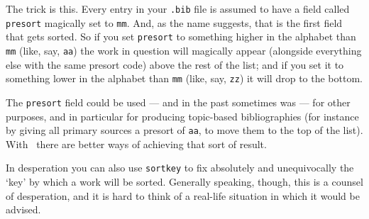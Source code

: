 The trick is this. Every entry in your \texttt{.bib} file is assumed
to have a field called \texttt{presort} magically set to
\texttt{mm}. And, as the name suggests, that is the first field that
gets sorted. So if you set \texttt{presort} to something higher in the
alphabet than \texttt{mm} (like, say, \texttt{aa}) the work in
question will magically appear (alongside everything else with the
same presort code) above the rest of the list; and if you set it to
something lower in the alphabet than \texttt{mm} (like, say,
\texttt{zz}) it will drop to the bottom.

The \texttt{presort} field could be used --- and in the past sometimes
was --- for other purposes, and in particular for producing
topic-based bibliographies (for instance by giving all primary sources
a presort of \texttt{aa}, to move them to the top of the list). With
\biblatex\ there are better ways of achieving that sort of
result.

In desperation you can also use \texttt{sortkey} to fix absolutely and
unequivocally the `key' by which a work will be sorted. Generally
speaking, though, this is a counsel of desperation, and it is hard to
think of a real-life situation in which it would be advised.

